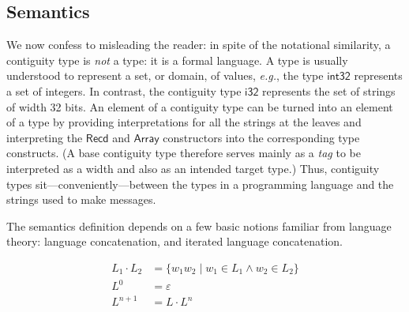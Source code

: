\documentclass[a4paper,UKenglish,cleveref, autoref, thm-restate]{lipics-v2021}
\newcommand{\eg}{\textit{e.g.}}
\newcommand{\konst}[1]{\ensuremath{\mathsf{#1}}}
\newcommand{\set}[1]{\ensuremath{\{ {#1} \}}}
\begin{document}
\subsection{Semantics}

 We now confess to misleading the reader: in spite of the notational
 similarity, a contiguity type is \emph{not} a type: it is a formal
 language. A type is usually understood to represent a set, or domain,
 of values, \eg, the type \konst{int32} represents a set of
 integers. In contrast, the contiguity type \konst{i32} represents the
 set of strings of width 32 bits. An element of a contiguity type can
 be turned into an element of a type by providing interpretations for
 all the strings at the leaves and interpreting the \konst{Recd} and
 \konst{Array} constructors into the corresponding type constructs. (A
 base contiguity type therefore serves mainly as a \emph{tag} to be
 interpreted as a width and also as an intended target type.) Thus,
 contiguity types sit---conveniently---between the types in a
 programming language and the strings used to make messages.

The semantics definition depends on a few basic notions familiar from
language theory: language concatenation, and iterated language
concatenation.

\begin{align*}
L_1 \cdot L_2 &= \set{w_1 w_2 \mid w_1 \in L_1 \land w_2 \in  L_2} \\
L^0 &= \varepsilon \\
L^{n+1} &= L \cdot L^n
\end{align*}
\end{document}

